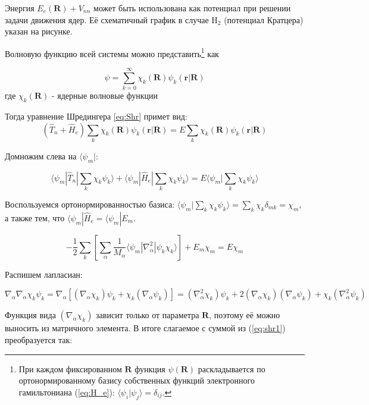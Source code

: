 \documentclass[12pt, oneside]{article}
\numberwithin{equation}{section}  %
\begin{document}
Энергия \(E_e(\bm{R}) + V_{nn}\) может быть использована как потенциал при решении задачи движения ядер. Её схематичный график в случае H\(_2\) (потенциал Кратцера) указан на рисунке. 


Волновую функцию всей системы можно представить\footnote{При каждом фиксированном \(\bm{R}\) функция \(\psi(\bm{R})\) раскладывается по ортонормированному базису собственных функций электронного гамильтониана (\ref{eq:H_e}): \(\langle \psi_i | \psi_j \rangle = \delta_{ij}\).} как 

\begin{equation}
    \psi = \sum_{k=0}^{\infty} \chi_k (\bm{R}) \psi_k (\bm{r}| \bm{R})
\end{equation}
где \(\chi_k(\bm{R})\) - ядерные волновые функции


Тогда уравнение Шредингера \ref{eq:Shr} примет вид:
\begin{equation}
(\hat{T}_n + \hat{H}_e) \sum_k \chi_k (\bm{R}) \psi_k (\bm{r}| \bm{R}) = E \sum_k \chi_k (\bm{R}) \psi_k (\bm{r}| \bm{R})
\end{equation}

Домножим слева на \(\langle \psi_m|\):

\begin{equation}
\langle \psi_m | \hat{T}_n | \sum_k \chi_k \psi_k \rangle + \langle \psi_m | \hat{H}_e | \sum_k \chi_k \psi_k \rangle = E \langle \psi_m | \sum_k \chi_k \psi_k \rangle
\end{equation}

Воспользуемся ортонормированностью базиса: \(\langle \psi_m | \sum_k \chi_k \psi_k \rangle = \sum_k \chi_k \delta_{mk} = \chi_m\), а также тем, что \(\langle \psi_m | \hat{H}_e = \langle \psi_m | E_m \).

\begin{equation}
- \frac{1}{2} \sum_{k} \left[ \sum_\alpha \frac{1}{M_\alpha} \langle \psi_m |\nabla_\alpha^2 | \psi_k \chi_k \rangle \right]
+ E_m \chi_m = E \chi_m
\label{eq:shr1}
\end{equation}

Распишем лапласиан:

\[\nabla_\alpha \nabla_\alpha \chi_k \psi_k = \nabla_\alpha \left[(\nabla_\alpha \chi_k ) \psi_k + \chi_k (\nabla_\alpha \psi_k)\right] = (\nabla_\alpha^2 \chi_k ) \psi_k + 2 (\nabla_\alpha \chi_k) (\nabla_\alpha \psi_k ) + \chi_k (\nabla_\alpha^2 \psi_k)\]

Функция вида \((\nabla_\alpha \chi_k)\) зависит только от параметра \(\bm{R}\), поэтому её можно выносить из матричного элемента. В итоге слагаемое с суммой из (\ref{eq:shr1}) преобразуется так:
\end{document}
